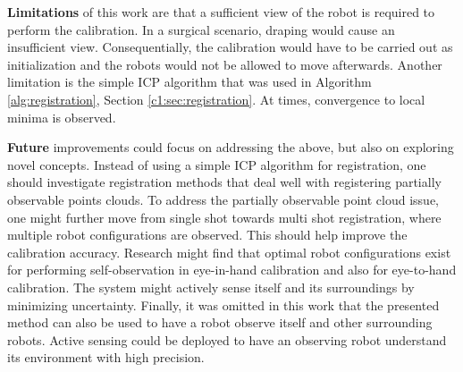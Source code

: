 \textbf{Limitations} of this work are that a sufficient view of the robot is required to perform the calibration. In a surgical scenario, draping would cause an insufficient view. Consequentially, the calibration would have to be carried out as initialization and the robots would not be allowed to move afterwards. Another limitation is the simple ICP algorithm that was used in Algorithm \ref{alg:registration}, Section \ref{c1:sec:registration}. At times, convergence to local minima is observed.

\textbf{Future} improvements could focus on addressing the above, but also on exploring novel concepts. Instead of using a simple ICP algorithm for registration, one should investigate registration methods that deal well with registering partially observable points clouds. To address the partially observable point cloud issue, one might further move from single shot towards multi shot registration, where multiple robot configurations are observed. This should help improve the calibration accuracy. Research might find that optimal robot configurations exist for performing self-observation in eye-in-hand calibration and also for eye-to-hand calibration. The system might actively sense itself and its surroundings by minimizing uncertainty. Finally, it was omitted in this work that the presented method can also be used to have a robot observe itself and other surrounding robots. Active sensing could be deployed to have an observing robot understand its environment with high precision.
